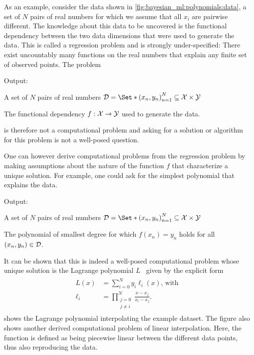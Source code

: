 As an example, consider the data shown in \cref{fig:bayesian_ml:polynomials:data}, a set of $N$ pairs of real numbers for which we assume that all $x_i$ are pairwise different.
The knowledge about this data to be uncovered is the functional dependency between the two data dimensions that were used to generate the data.
This is called a regression problem and is strongly under-specified:
There exist uncountably many functions on the real numbers that explain any finite set of observed points.
The problem
\begin{problem}[Regression]
\label{prob:bayesian_ml:regression}
\begin{labeling}{Output:}
    \item[Input:] A set of $N$ pairs of real numbers $\Dc = \Set*{\left(x_n, y_n\right)}_{n=1}^N \subseteq \Xc \times \Yc$
    \item[Output:] The functional dependency $f : \mathcal{X} \to \mathcal{Y}$ used to generate the data.
\end{labeling}
\end{problem}
is therefore not a computational problem and asking for a solution or algorithm for this problem is not a well-posed question.

One can however derive computational problems from the regression problem by making assumptions about the nature of the function $f$ that characterize a unique solution.
For example, one could ask for the simplest polynomial that explains the data.
\begin{problem}
\label{prob:bayesian_ml:lagrange}
\begin{labeling}{Output:}
    \item[Input:] A set of $N$ pairs of real numbers $\Dc = \Set*{\left(x_n, y_n\right)}_{n=1}^N \subseteq \Xc \times \Yc$
    \item[Output:] The polynomial of smallest degree for which $f(x_n) = y_n$ holds for all $(x_n, y_n) \in \mathcal{D}$.
\end{labeling}
\end{problem}
It can be shown that this is indeed a well-posed computational problem whose unique solution is the Lagrange polynomial $L$~\parencite{waring_vii._1779} given by the explicit form
\begin{align}
    \begin{split}
        L(x) &= \sum_{i=0}^N y_i \ell_i(x)\text{, with} \\
        \ell_i &= \prod_{\substack{j = 0\\j \neq i}}^N \frac{x - x_j}{x_i - x_j}.
    \end{split}
    \label{eq:bayesian_ml:lagrange}
\end{align}
 shows the Lagrange polynomial interpolating the example dataset.
The figure also shows another derived computational problem of linear interpolation.
Here, the function is defined as being piecewise linear between the different data points, thus also reproducing the data.

